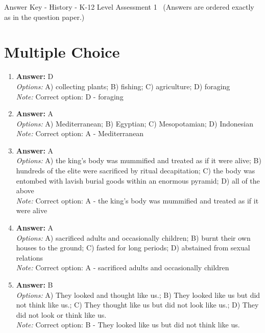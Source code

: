 \documentclass[12pt]{article}
\begin{document}
\begin{center}
Answer Key - History - K-12 Level Assessment 1 \
\small (Answers are ordered exactly as in the question paper.)
\end{center}

\section*{Multiple Choice}
\begin{enumerate}[label=\arabic*.]
\item \textbf{Answer:} D
\\ \textit{Options:} A) collecting plants; B) fishing; C) agriculture; D) foraging
\\ \textit{Note:} Correct option: D - foraging
\item \textbf{Answer:} A
\\ \textit{Options:} A) Mediterranean; B) Egyptian; C) Mesopotamian; D) Indonesian
\\ \textit{Note:} Correct option: A - Mediterranean
\item \textbf{Answer:} A
\\ \textit{Options:} A) the king's body was mummified and treated as if it were alive; B) hundreds of the elite were sacrificed by ritual decapitation; C) the body was entombed with lavish burial goods within an enormous pyramid; D) all of the above
\\ \textit{Note:} Correct option: A - the king's body was mummified and treated as if it were alive
\item \textbf{Answer:} A
\\ \textit{Options:} A) sacrificed adults and occasionally children; B) burnt their own houses to the ground; C) fasted for long periods; D) abstained from sexual relations
\\ \textit{Note:} Correct option: A - sacrificed adults and occasionally children
\item \textbf{Answer:} B
\\ \textit{Options:} A) They looked and thought like us.; B) They looked like us but did not think like us.; C) They thought like us but did not look like us.; D) They did not look or think like us.
\\ \textit{Note:} Correct option: B - They looked like us but did not think like us.
\end{enumerate}
\end{document}
